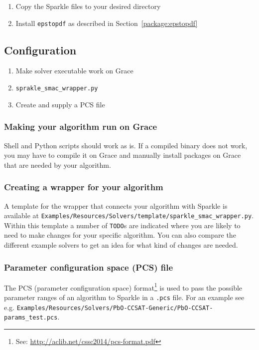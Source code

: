\documentclass{article}
\begin{document}
\begin{enumerate}
  \item Copy the Sparkle files to your desired directory
  \item Install \texttt{epstopdf} as described in Section~\ref{package:epstopdf}
\end{enumerate}

\subsection{Configuration}

\begin{enumerate}
  \item Make solver executable work on Grace
  \item \texttt{sprakle\_smac\_wrapper.py}
  \item Create and supply a PCS file
\end{enumerate}

\subsubsection{Making your algorithm run on Grace}
Shell and Python scripts should work as is. If a compiled binary does not work, you may have to compile it on Grace and manually install packages on Grace that are needed by your algorithm.

\subsubsection{Creating a wrapper for your algorithm}
A template for the wrapper that connects your algorithm with Sparkle is available at \texttt{Examples/Resources/Solvers/template/sparkle\_smac\_wrapper.py}. Within this template a number of \texttt{TODO}s are indicated where you are likely to need to make changes for your specific algorithm. You can also compare the different example solvers to get an idea for what kind of changes are needed.

\subsubsection{Parameter configuration space (PCS) file}
The PCS (parameter configuration space) format\footnote{See: \url{http://aclib.net/cssc2014/pcs-format.pdf}} is used to pass the possible parameter ranges of an algorithm to Sparkle in a \texttt{.pcs} file. For an example see e.g. \texttt{Examples/Resources/Solvers/PbO-CCSAT-Generic/PbO-CCSAT-params\_test.pcs}.
\end{document}
